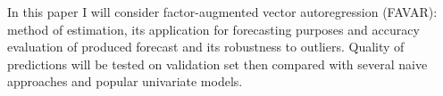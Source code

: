 \documentclass[a4paper, 14pt]{article}
\begin{document}
In this paper I will consider factor-augmented vector autoregression (FAVAR): method of estimation, its application for forecasting purposes and accuracy evaluation of produced forecast and its robustness to outliers. Quality of predictions will be tested on validation set then compared with several naive approaches and popular univariate models. 
 

\newpage


\end{document}
